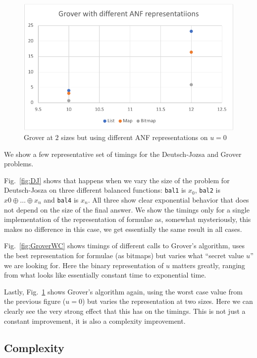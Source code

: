 \documentclass[sigplan,screen]{acmart}
\theoremstyle{definition}
\begin{document}
\begin{figure}
\includegraphics[scale=0.6]{../execution/RetroPE/Grover1.pdf}
  \caption{\label{fig:GroverImpl} Grover at $2$ sizes but using different ANF representations on $u=0$}
\end{figure}

We show a few representative set of timings for the Deutsch-Jozsa and
Grover problems.

Fig.~\ref{fig:DJ} shows that happens when we vary the
size of the problem for Deutsch-Josza on three different balanced
functions: \texttt{bal1} is $x_0$, \texttt{bal2} is $x0\oplus\ldots\oplus x_n$
and \texttt{bal4} is $x_n$. All three show
clear exponential behavior that does not depend on the size of the final
answer. We show the timings only for a single implementation of the
representation of formulae as, somewhat mysteriously, this makes no
difference in this case, we get essentially the same result in all cases.

Fig.~\ref{fig:GroverWC} shows timings of different calls to Grover's
algorithm, uses the best representation for formulae (as bitmaps) but varies
what ``secret value $u$'' we are looking for. Here
the binary representation of $u$ matters greatly, ranging from what looks
like essentially constant time to exponential time.

Lastly, Fig.~\ref{fig:GroverImpl} shows Grover's algorithm again, using the
worst case value from the previous figure ($u=0$) but varies the representation
at two sizes. Here we can clearly see the very strong effect that this has
on the timings. This is not just a constant improvement, it is also a complexity
improvement.

\subsection{Complexity}
\label{sub:complexity}
\end{document}
